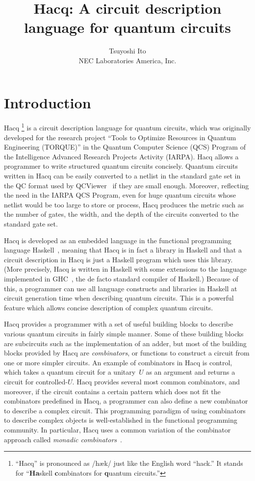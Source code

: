 \documentclass[11pt]{article}
\title{Hacq: A circuit description language for quantum circuits}
\author{Tsuyoshi Ito \\
  NEC Laboratories America, Inc.}
\date{}
\begin{document}
\maketitle

\section{Introduction}

Hacq%
\footnote{``Hacq'' is pronounced as /h\ae k/ just like the English word ``hack.''
  It stands for ``\textbf{Ha}skell \textbf{c}ombinators for \textbf{q}uantum circuits.''}
is a circuit description language for quantum circuits,
which was originally developed
for the research project ``Tools to Optimize Resources in Quantum Engineering (TORQUE)''
in the Quantum Computer Science (QCS) Program
of the Intelligence Advanced Research Projects Activity (IARPA).
Hacq allows a programmer to write structured quantum circuits concisely.
Quantum circuits written in Hacq can be easily converted to a netlist in the standard gate set
in the QC format used by QCViewer~\cite{QCViewer} if they are small enough.
Moreover, reflecting the need in the IARPA QCS Program,
even for huge quantum circuits whose netlist would be too large to store or process,
Hacq produces the metric such as the number of gates, the width, and the depth
of the circuits converted to the standard gate set.

Hacq is developed as an embedded language
in the functional programming language Haskell~\cite{HudHugPeyWad07HOPL},
meaning that Hacq is in fact a library in Haskell
and that a circuit description in Hacq is just a Haskell program which uses this library.
(More precisely, Hacq is written in Haskell with some extensions to the language implemented in GHC~\cite{GHC},
the de facto standard compiler of Haskell.)
Because of this, a programmer can use all language constructs and libraries in Haskell at circuit generation time
when describing quantum circuits.
This is a powerful feature which allows concise description of complex quantum circuits.

Hacq provides a programmer with a set of useful building blocks
to describe various quantum circuits in fairly simple manner.
Some of these building blocks are subcircuits such as the implementation of an adder,
but most of the building blocks provided by Hacq are \emph{combinators},
or functions to construct a circuit from one or more simpler circuits.
An example of combinators in Hacq is \textsf{control},
which takes a quantum circuit for a unitary~$U$ as an argument and returns a circuit for controlled-$U$.
Hacq provides several most common combinators,
and moreover, if the circuit contains a certain pattern which does not fit the combinators predefined in Hacq,
a programmer can also define a new combinator to describe a complex circuit.
This programming paradigm of using combinators to describe complex objects
is well-established in the functional programming community.
In particular, Hacq uses a common variation of the combinator approach
called \emph{monadic combinators}~\cite{Wadler95AFP}.
\end{document}

